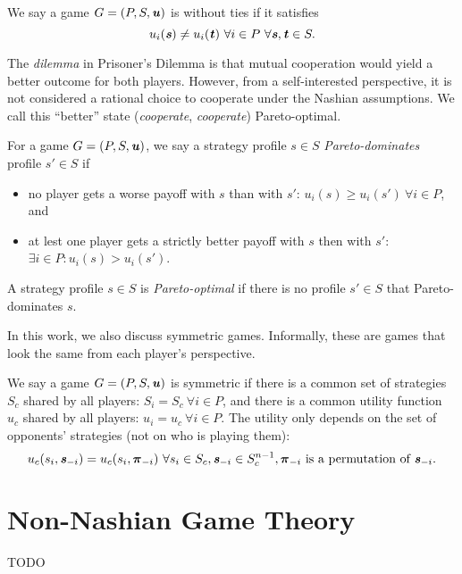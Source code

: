 \begin{definition}
  We say a game $G = (P, S, \boldsymbol{\mathit{u}})$ is without ties if it satisfies
  \[
    u_i(\boldsymbol{\mathit{s}}) \ne u_i(\boldsymbol{\mathit{t}})\ \forall i \in P\ \forall \boldsymbol{\mathit{s}}, \boldsymbol{\mathit{t}} \in S.
  \]
\end{definition}

The \textit{dilemma} in Prisoner's Dilemma is that mutual cooperation would yield a better outcome for both players.
However, from a self-interested perspective, it is not considered a rational choice to cooperate under the Nashian assumptions.
We call this \enquote{better} state (\textit{cooperate}, \textit{cooperate}) Pareto-optimal.

\begin{definition}
  For a game $G = (P, S, \boldsymbol{\mathit{u}})$, we say a strategy profile $s \in S$ \textit{Pareto-dominates} profile $s' \in S$ if
  \begin{itemize}
    \item no player gets a worse payoff with $s$ than with $s'$: $u_i(s) \ge u_i(s')\ \forall i \in P$, and
    \item at lest one player gets a strictly better payoff with $s$ then with $s'$: $\exists i \in P: u_i(s) > u_i(s')$.
  \end{itemize}
  A strategy profile $s \in S$ is \textit{Pareto-optimal} if there is no profile $s' \in S$ that Pareto-dominates $s$.
\end{definition}

In this work, we also discuss symmetric games.
Informally, these are games that look the same from each player's perspective.

\begin{definition}
	We say a game $G = (P, S, \boldsymbol{\mathit{u}})$ is symmetric if there is a common set of strategies $S_c$ shared by all players:
  $S_i = S_c\ \forall i \in P$,
  and there is a common utility function $u_c$ shared by all players:
  $u_i = u_c\ \forall i \in P$.
  The utility only depends on the set of opponents' strategies (not on who is playing them):
  \[
    u_c(s_i, \boldsymbol{\mathit{s}}_{-i}) = u_c(s_i, \boldsymbol{\pi}_{-i})\ \forall s_i \in S_c, \boldsymbol{\mathit{s}}_{-i} \in S_c^{n-1}, \boldsymbol{\pi}_{-i} \text{ is a permutation of } \boldsymbol{\mathit{s}}_{-i}.
  \]
\end{definition}

\section{Non-Nashian Game Theory}
\begin{definition}
  TODO
\end{definition}

